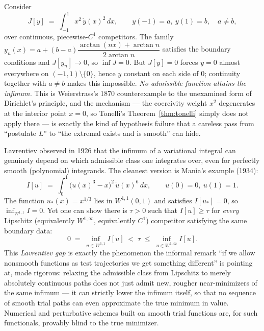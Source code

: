 \begin{example}
\label{ex:weierstrass}
Consider
\[
J[y] \;=\; \int_{-1}^{1} x^2\, \dot y(x)^2\, dx, \qquad y(-1)=a,\ y(1)=b,\quad a\ne b,
\]
over continuous, piecewise-$C^1$ competitors. The family
    $y_n(x)=a+(b-a)\dfrac{\arctan(nx)+\arctan n}{2\arctan n}$ satisfies the
    boundary conditions and $J[y_n]\to 0$, so $\inf J = 0$. But $J[y]=0$ forces
    $\dot y=0$ almost everywhere on $(-1,1)\setminus\{0\}$, hence $y$ constant
    on each side of $0$; continuity together with $a\ne b$ makes this
    impossible. \emph{No admissible function attains the infimum.} This is
    Weierstrass's 1870 counterexample to the unexamined form of Dirichlet's
    principle, and the mechanism --- the coercivity weight $x^2$ degenerates at
    the interior point $x=0$, so Tonelli's Theorem~\ref{thm:tonelli} simply
    does not apply there --- is exactly the kind of hypothesis failure that a
    careless pass from ``postulate $L$'' to ``the extremal exists and is
    smooth'' can hide.
\end{example}

\begin{example}
\label{ex:lavrentiev}
Lavrentiev observed in 1926 that the infimum of a variational integral can
    genuinely depend on which admissible class one integrates over, even for
    perfectly smooth (polynomial) integrands. The cleanest version is Man\`ia's
    example (1934):
\[
I[u] \;=\; \int_0^1 \bigl(u(x)^3-x\bigr)^2\, \dot u(x)^6\, dx, \qquad u(0)=0,\ u(1)=1.
\]
The function $u_\ast(x)=x^{1/3}$ lies in $W^{1,1}(0,1)$ and satisfies
    $I[u_\ast]=0$, so $\inf_{W^{1,1}} I = 0$. Yet one can show there is
    $\tau>0$ such that $I[u]\ge \tau$ for \emph{every} Lipschitz (equivalently
    $W^{1,\infty}$, equivalently $C^1$) competitor satisfying the same boundary
    data:
\[
0 \;=\; \inf_{u\in W^{1,1}} I[u] \;<\; \tau \;\le\; \inf_{u \in W^{1,\infty}} I[u].
\]
This \emph{Lavrentiev gap} is exactly the phenomenon the informal remark ``if
    we allow nonsmooth functions as test trajectories we get something
    different'' is pointing at, made rigorous: relaxing the admissible class
    from Lipschitz to merely absolutely continuous paths does not just admit
    new, rougher near-minimizers of the same infimum --- it can strictly lower
    the infimum itself, so that no sequence of smooth trial paths can even
    approximate the true minimum in value. Numerical and perturbative schemes
    built on smooth trial functions are, for such functionals, provably blind
    to the true minimizer.
\end{example}

